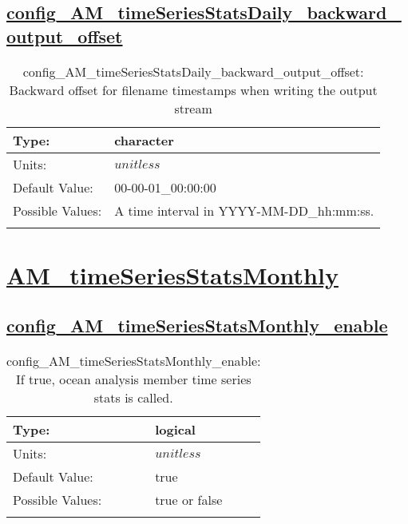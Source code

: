 \subsection[config\_AM\_timeSeriesStatsDaily\_backward\_output\_offset]{\hyperref[sec:nm_tab_AM_timeSeriesStatsDaily]{config\_AM\_timeSeriesStatsDaily\_backward\_output\_offset}}
\label{subsec:nm_sec_config_AM_timeSeriesStatsDaily_backward_output_offset}
\begin{center}
\begin{longtable}{| p{2.0in} || p{4.0in} |}
    \hline
    Type: & character \\
    \hline
    Units: & $unitless$ \\
    \hline
    Default Value: & 00-00-01\_00:00:00 \\
    \hline
    Possible Values: & A time interval in YYYY-MM-DD\_hh:mm:ss. \\
    \hline
    \caption{config\_AM\_timeSeriesStatsDaily\_backward\_output\_offset: Backward offset for filename timestamps when writing the output stream}
\end{longtable}
\end{center}
\section[AM\_timeSeriesStatsMonthly]{\hyperref[sec:nm_tab_AM_timeSeriesStatsMonthly]{AM\_timeSeriesStatsMonthly}}
\label{sec:nm_sec_AM_timeSeriesStatsMonthly}
\subsection[config\_AM\_timeSeriesStatsMonthly\_enable]{\hyperref[sec:nm_tab_AM_timeSeriesStatsMonthly]{config\_AM\_timeSeriesStatsMonthly\_enable}}
\label{subsec:nm_sec_config_AM_timeSeriesStatsMonthly_enable}
\begin{center}
\begin{longtable}{| p{2.0in} || p{4.0in} |}
    \hline
    Type: & logical \\
    \hline
    Units: & $unitless$ \\
    \hline
    Default Value: & true \\
    \hline
    Possible Values: & true or false \\
    \hline
    \caption{config\_AM\_timeSeriesStatsMonthly\_enable: If true, ocean analysis member time series stats is called.}
\end{longtable}
\end{center}
